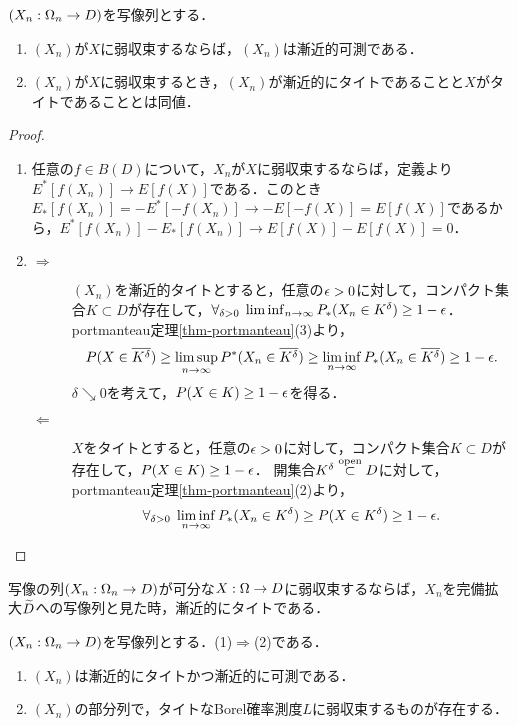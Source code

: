 \documentclass[uplatex,dvipdfmx]{jsreport}
\begin{document}
\begin{proposition}[純方向は簡単]\label{prop-inverse-of-Prokhorov}
    $(X_n:\Omega_n\to D)$を写像列とする．
    \begin{enumerate}
        \item $(X_n)$が$X$に弱収束するならば，$(X_n)$は漸近的可測である．
        \item $(X_n)$が$X$に弱収束するとき，$(X_n)$が漸近的にタイトであることと$X$がタイトであることとは同値．
    \end{enumerate}
\end{proposition}
\begin{proof}\mbox{}
    \begin{enumerate}
        \item 任意の$f\in B(D)$について，$X_n$が$X$に弱収束するならば，定義より$E^*[f(X_n)]\to E[f(X)]$である．このとき$E_*[f(X_n)]=-E^*[-f(X_n)]\to-E[-f(X)]=E[f(X)]$であるから，$E^*[f(X_n)]-E_*[f(X_n)]\to E[f(X)]-E[f(X)]=0$．
        \item 
        \begin{description}
            \item[$\Rightarrow$] 
            $(X_n)$を漸近的タイトとすると，任意の$\epsilon>0$に対して，コンパクト集合$K\subset D$が存在して，$\forall_{\delta>0}\;\liminf_{n\to\infty}P_*(X_n\in K^\delta)\ge 1-\epsilon$．portmanteau定理\ref{thm-portmanteau}(3)より，
            \[P(X\in\overline{K^\delta})\ge\limsup_{n\to\infty}P^*(X_n\in\overline{K^\delta})\ge\liminf_{n\to\infty}P_*(X_n\in\overline{K^\delta})\ge 1-\epsilon.\]
            $\delta\searrow 0$を考えて，$P(X\in K)\ge 1-\epsilon$を得る．
            \item[$\Leftarrow$]
            $X$をタイトとすると，任意の$\epsilon>0$に対して，コンパクト集合$K\subset D$が存在して，$P(X\in K)\ge 1-\epsilon$．
            開集合$K^\delta\overset{\mathrm{open}}{\subset} D$に対して，portmanteau定理\ref{thm-portmanteau}(2)より，
            \[\forall_{\delta>0}\;\liminf_{n\to\infty}P_*(X_n\in K^\delta)\ge P(X\in K^\delta)\ge 1-\epsilon.\]
        \end{description}
    \end{enumerate}
\end{proof}

\begin{corollary}
    写像の列$(X_n:\Omega_n\to D)$が可分な$X:\Omega\to D$に弱収束するならば，$X_n$を完備拡大$\widetilde{D}$への写像列と見た時，漸近的にタイトである．
\end{corollary}

\begin{theorem}[Prokhorov]\label{thm-Prokhorov}
    $(X_n:\Omega_n\to D)$を写像列とする．(1)$\Rightarrow$(2)である．
    \begin{enumerate}
        \item $(X_n)$は漸近的にタイトかつ漸近的に可測である．
        \item $(X_n)$の部分列で，タイトなBorel確率測度$L$に弱収束するものが存在する．
    \end{enumerate}
\end{theorem}
\end{document}
